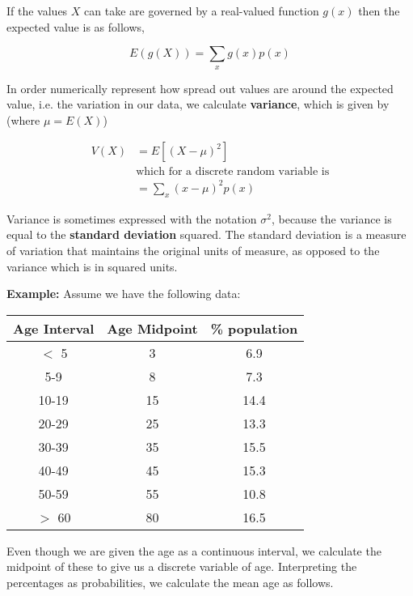 If the values $X$ can take are governed by a real-valued function $g(x)$ then the expected value is as follows,

\begin{equation*}
	E(g(X)) = \sum_{x}g(x)p(x)
\end{equation*}

In order numerically represent how spread out values are around the expected value, i.e. the variation in our data, we calculate \textbf{variance},
which is given by (where $\mu = E(X)$)

\begin{align*}
	V(X)&=E[(X-\mu)^2]\\
	& \textrm{which for a discrete random variable is} \\
	&=\sum_{x}(x-\mu)^{2}p(x)
\end{align*}

Variance is sometimes expressed with the notation $\sigma ^2$, because the variance is equal to the \textbf{standard deviation} squared. The standard deviation
is a measure of variation that maintains the original units of measure, as opposed to the variance which is in squared units.\newline \par

\textbf{Example:} Assume we have the following data:

\begin{center}
\begin{tabular}{|c c c|} 
 \hline
 Age Interval & Age Midpoint & \% population \\ [0.5ex] 
 \hline\hline
 $<$ 5 & 3 & 6.9 \\ 
 \hline
 5-9 & 8 & 7.3 \\
 \hline
 10-19 & 15 & 14.4 \\
 \hline
 20-29 & 25 & 13.3 \\
 \hline
 30-39 & 35 & 15.5 \\
 \hline
 40-49 & 45 & 15.3 \\
 \hline
 50-59 & 55 & 10.8 \\
 \hline
 $>$ 60 & 80 & 16.5 \\ [1ex]
 \hline
\end{tabular}
\end{center}

Even though we are given the age as a continuous interval, we calculate the midpoint of these to give us
a discrete variable of age. Interpreting the percentages as probabilities, we calculate the mean age as follows.

